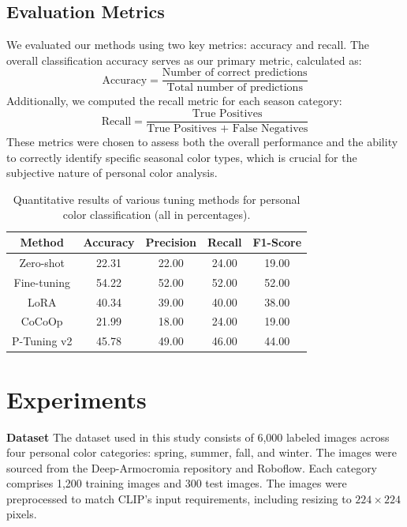 \documentclass[twocolumn]{article}
\begin{document}
\subsection{Evaluation Metrics}
We evaluated our methods using two key metrics: accuracy and recall. The overall classification accuracy serves as our primary metric, calculated as:
\begin{equation}
\text{Accuracy} = \frac{\text{Number of correct predictions}}{\text{Total number of predictions}}
\end{equation}
Additionally, we computed the recall metric for each season category:
\begin{equation}
\text{Recall} = \frac{\text{True Positives}}{\text{True Positives + False Negatives}}
\end{equation}
These metrics were chosen to assess both the overall performance and the ability to correctly identify specific seasonal color types, which is crucial for the subjective nature of personal color analysis.

\begin{table}[t]
\centering
\begin{tabular}{|c|c|c|c|c|}
\hline
\textbf{Method} & \textbf{Accuracy} & \textbf{Precision} & \textbf{Recall} & \textbf{F1-Score} \\
\hline
Zero-shot    & 22.31 & 22.00 & 24.00 & 19.00 \\
Fine-tuning  & 54.22 & 52.00 & 52.00 & 52.00 \\
LoRA         & 40.34 & 39.00 & 40.00 & 38.00 \\
CoCoOp       & 21.99 & 18.00 & 24.00 & 19.00 \\
P-Tuning v2  & 45.78 & 49.00 & 46.00 & 44.00 \\
\hline
\end{tabular}
\caption{Quantitative results of various tuning methods for personal color classification (all in percentages).}
\label{tab:quant_results}
\end{table}

\section{Experiments}
\textbf{Dataset}
The dataset used in this study consists of 6,000 labeled images across four personal color categories: spring, summer, fall, and winter. The images were sourced from the Deep-Armocromia repository \cite{stacchiodeep} and Roboflow. Each category comprises 1,200 training images and 300 test images. The images were preprocessed to match CLIP's input requirements, including resizing to $224\times224$ pixels.
\end{document}
